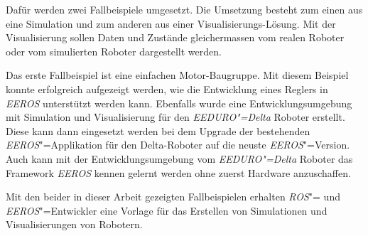 Dafür werden zwei Fallbeispiele umgesetzt.
Die Umsetzung besteht zum einen aus eine Simulation und zum anderen aus einer Visualisierungs-Lösung.
Mit der Visualisierung sollen Daten und Zustände gleichermassen vom realen Roboter oder vom simulierten Roboter dargestellt werden.


Das erste Fallbeispiel ist eine einfachen Motor-Baugruppe.
Mit diesem Beispiel konnte erfolgreich aufgezeigt werden, wie die Entwicklung eines Reglers in \textit{EEROS} unterstützt werden kann.
Ebenfalls wurde eine Entwicklungsumgebung mit Simulation und Visualisierung für den \textit{EEDURO"=Delta} Roboter erstellt.
Diese kann dann eingesetzt werden bei dem Upgrade der bestehenden \textit{EEROS}"=Applikation für den Delta-Roboter auf die neuste \textit{EEROS}"=Version.
Auch kann mit der Entwicklungsumgebung vom \textit{EEDURO"=Delta} Roboter das Framework \textit{EEROS} kennen gelernt werden ohne zuerst Hardware anzuschaffen.


Mit den beider in dieser Arbeit gezeigten Fallbeispielen erhalten \textit{ROS}"= und \textit{EEROS}"=Entwickler eine Vorlage für das Erstellen von Simulationen und Visualisierungen von Robotern.

